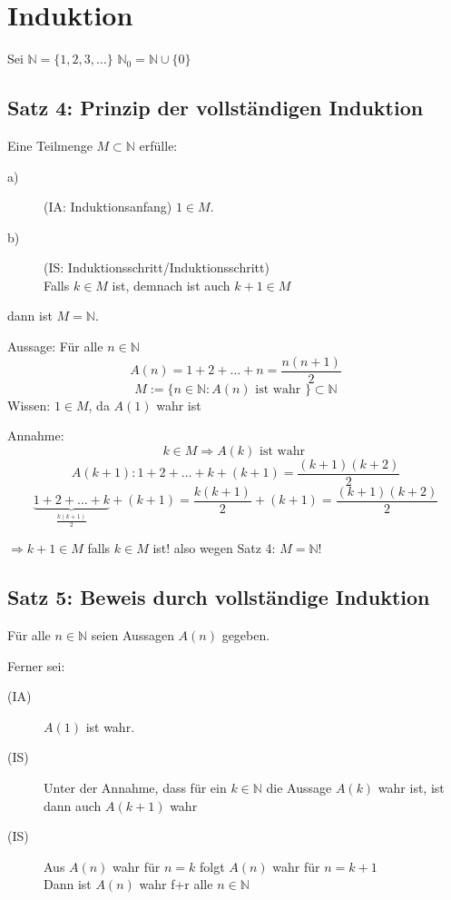 \documentclass[fleqn]{scrbook}
\newcommand{\N}{\mathbb{N}}
\newenvironment{example}{{\bfseries Beispiel }}{}
\begin{document}
\section{Induktion}

Sei $\N = \{1,2,3,\ldots\}$
$\N_0=\N \cup \{0\}$

\subsection{Satz 4: Prinzip der vollständigen Induktion}

Eine Teilmenge $M \subset \N$ erfülle:

\begin{description}
 \item[a)] (IA: Induktionsanfang) $1 \in M$.
 \item[b)] (IS: Induktionsschritt/Induktionsschritt) \\
    Falls $k \in M$ ist, demnach ist auch $k+1 \in M$
\end{description}

dann ist $M = \N$.

\begin{example}
Aussage: Für alle $n \in \N$
\[A(n) = 1+2+\ldots+n = \frac{n(n+1)}{2}\]
\[M:=\{n \in \N : A(n) \text{ ist wahr }\} \subset \N\]
Wissen: $1 \in M$, da $A(1)$ wahr ist

Annahme: 
\[k \in M \Longrightarrow A(k) \text{ ist wahr }\]
\[A(k+1):1+2+\ldots+k+(k+1)= \frac{(k+1)(k+2)}{2}\]
\[\underbrace{1+2+\ldots+k}_{\frac{k(k+1)}{2}}+(k+1)= \frac{k(k+1)}{2}+(k+1)=\frac{(k+1)(k+2)}{2}\]

$\Longrightarrow k+1 \in M$ falls $k \in M$ ist! also wegen Satz 4: $M=\N$!
\end{example}

\subsection{Satz 5: Beweis durch vollständige Induktion}

Für alle $n \in \N$ seien Aussagen $A(n)$ gegeben.

Ferner sei:

\begin{description}
 \item[(IA)] $A(1)$ ist wahr.
 \item[(IS)] Unter der Annahme, dass für ein $k \in \N$ die Aussage $A(k)$ wahr ist, ist dann auch $A(k+1)$ wahr
 \item[(IS)] Aus $A(n)$ wahr für $n=k$ folgt $A(n)$ wahr für $n=k+1$ \\
   Dann ist $A(n)$ wahr f+r alle $n \in \N$
\end{description}
\end{document}
